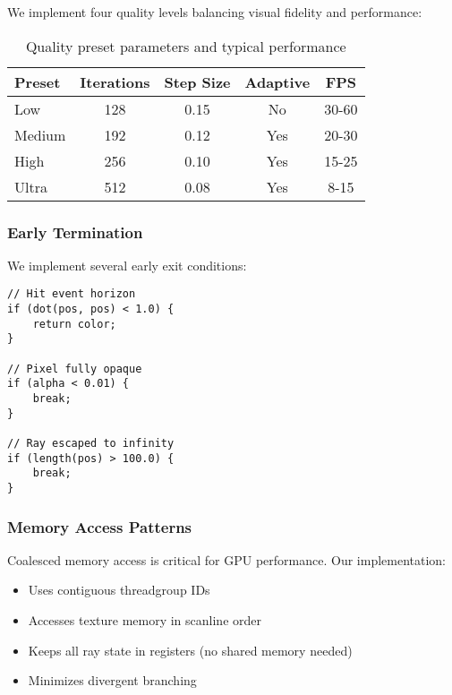 \documentclass[12pt,a4paper]{article}
\theoremstyle{definition}
\theoremstyle{remark}
\begin{document}
We implement four quality levels balancing visual fidelity and performance:

\begin{table}[H]
\centering
\caption{Quality preset parameters and typical performance}
\begin{tabular}{lcccc}
\toprule
\textbf{Preset} & \textbf{Iterations} & \textbf{Step Size} & \textbf{Adaptive} & \textbf{FPS} \\
\midrule
Low & 128 & 0.15 & No & 30-60 \\
Medium & 192 & 0.12 & Yes & 20-30 \\
High & 256 & 0.10 & Yes & 15-25 \\
Ultra & 512 & 0.08 & Yes & 8-15 \\
\bottomrule
\end{tabular}
\label{tab:quality_presets}
\end{table}

\subsubsection{Early Termination}

We implement several early exit conditions:

\begin{lstlisting}[style=metalstyle, caption=Early termination conditions]
// Hit event horizon
if (dot(pos, pos) < 1.0) {
    return color;
}

// Pixel fully opaque
if (alpha < 0.01) {
    break;
}

// Ray escaped to infinity
if (length(pos) > 100.0) {
    break;
}
\end{lstlisting}

\subsubsection{Memory Access Patterns}

Coalesced memory access is critical for GPU performance. Our implementation:

\begin{itemize}
    \item Uses contiguous threadgroup IDs
    \item Accesses texture memory in scanline order
    \item Keeps all ray state in registers (no shared memory needed)
    \item Minimizes divergent branching
\end{itemize}
\end{document}
